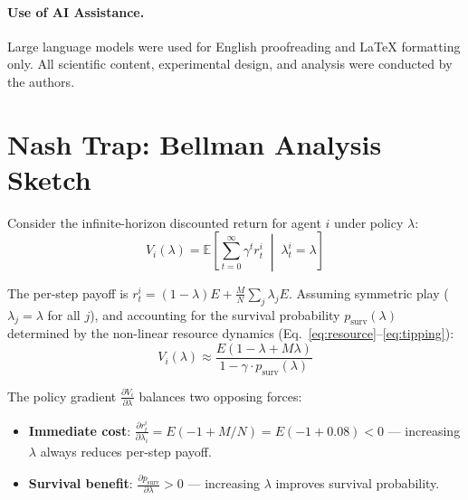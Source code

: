 \documentclass{article}
\begin{document}
\paragraph{Use of AI Assistance.} Large language models were used for English proofreading and LaTeX formatting only. All scientific content, experimental design, and analysis were conducted by the authors.




\newpage
\appendix

\section{Nash Trap: Bellman Analysis Sketch}
\label{app:nash_trap}

Consider the infinite-horizon discounted return for agent $i$ under policy $\lambda$:
\begin{equation}
V_i(\lambda) = \mathbb{E}\left[\sum_{t=0}^{\infty} \gamma^t r_t^i \;\middle|\; \lambda_t^i = \lambda\right]
\end{equation}

The per-step payoff is $r_t^i = (1 - \lambda) E + \frac{M}{N} \sum_j \lambda_j E$.
Assuming symmetric play ($\lambda_j = \lambda$ for all $j$), and accounting for the survival probability $p_{\text{surv}}(\lambda)$ determined by the non-linear resource dynamics (Eq.~\ref{eq:resource}--\ref{eq:tipping}):
\begin{equation}
V_i(\lambda) \approx \frac{E(1 - \lambda + M\lambda)}{1 - \gamma \cdot p_{\text{surv}}(\lambda)}
\end{equation}

The policy gradient $\frac{\partial V_i}{\partial \lambda}$ balances two opposing forces:
\begin{itemize}
    \item \textbf{Immediate cost}: $\frac{\partial r_t^i}{\partial \lambda_i} = E(-1 + M/N) = E(-1 + 0.08) < 0$ --- increasing $\lambda$ always reduces per-step payoff.
    \item \textbf{Survival benefit}: $\frac{\partial p_{\text{surv}}}{\partial \lambda} > 0$ --- increasing $\lambda$ improves survival probability.
\end{itemize}
\end{document}
